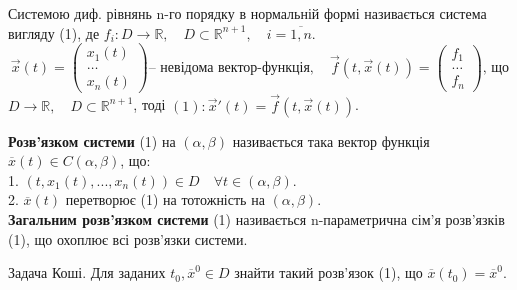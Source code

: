 \documentclass[14pt,a4paper]{scrartcl}
\theoremstyle{definition}
\theoremstyle{remark}
\theoremstyle{definition}
\theoremstyle{definition}
\begin{document}
 Системою диф. рівнянь n-го порядку в нормальній формі називається система вигляду (1), де $ f_i : D \to \mathbb{R}, \quad D \subset \mathbb{R}^{n+1 }, \quad i = \overline{1, n}$. 
\look
\[
      \vec{x}(t) = \left(\begin{array}{l}
      x_1(t)    \\
      \dots     \\
      x_n(t)
      \end{array}\right) \text{-- невідома вектор-функція}, \quad
      \vec{f}(t, \vec{x}(t)) = \left(\begin{array}{l}
      f_1     \\
      \dots  \\
      f_n
      \end{array}\right) \text{, що}
\]
$D \rightarrow \mathbb{R}, \quad D \subset \mathbb{R}^{n+1}$, тоді $(1): \vec{x}'(t) = \vec{f}(t, \vec{x}(t))$.


\def\rect{\textbf{П}}
\bd
\textbf{Розв'язком системи } (1) на $(\alpha , \beta)$ називається така вектор функція $\overline{x} (t) \in C(\alpha , \beta)$, що:\\
1. $(t, x_1 (t), ..., x_n(t))  \in D \quad \forall t \in (\alpha , \beta)$. \\
2. $ \overline{x} (t)$ перетворює (1) на тотожність на $(\alpha , \beta)$. \\
\textbf{Загальним розв'язком системи}  (1) називається n-параметрична сім'я розв'язків (1), що охоплює всі розв'язки системи.
\ed

Задача Коші. Для заданих $t_0, \overline{x}^{0} \in D$ знайти такий розв'язок (1), що $\overline{x} (t_0) = \overline{x}^{0}$.
\end{document}
